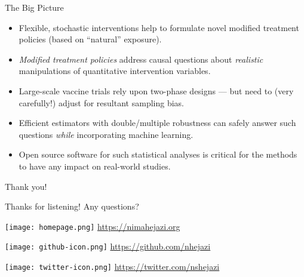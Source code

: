\documentclass{beamer}
\begin{document}



\begin{frame}[c]{The Big Picture}

\begin{center}
\begin{itemize}
  \itemsep8pt
  \item Flexible, stochastic interventions help to formulate novel modified
    treatment policies (based on ``natural'' exposure).
  \item \textit{Modified treatment policies} address causal questions about
    \textit{realistic} manipulations of quantitative intervention variables.
  \item Large-scale vaccine trials rely upon two-phase designs --- but need to
    (very carefully!) adjust for resultant sampling bias.
  \item Efficient estimators with double/multiple robustness can safely answer
    such questions \textit{while} incorporating machine learning.
  \item Open source software for such statistical analyses is critical for the
    methods to have any impact on real-world studies.
\end{itemize}
\end{center}

\note{
}

\end{frame}


\begin{frame}[c]{Thank you!}

\Large{Thanks for listening! Any questions?}

\vspace{2mm}
\texttt{[image: homepage.png]} \url{https://nimahejazi.org}

\vspace{2mm}
\texttt{[image: github-icon.png]}
  \url{https://github.com/nhejazi}

\vspace{2mm}
\texttt{[image: twitter-icon.png]}
  \url{https://twitter.com/nshejazi}

\end{frame}
\end{document}
